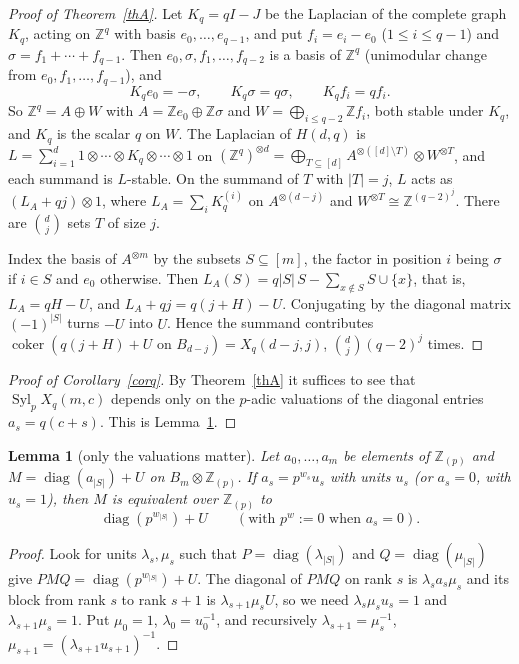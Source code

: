 \documentclass[10pt]{article}
\theoremstyle{ds}
\newtheorem{lemma}{Lemma}
\theoremstyle{dsrem}
\newcommand{\Z}{\mathbb{Z}}
\newcommand{\Syl}{\operatorname{Syl}}
\newcommand{\coker}{\operatorname{coker}}
\begin{document}
\begin{proof}[Proof of Theorem~\ref{thA}]
Let $K_q=qI-J$ be the Laplacian of the complete graph $K_q$, acting on $\Z^q$ with basis $e_0,\dots,e_{q-1}$, and put $f_i=e_i-e_0$ ($1\le i\le q-1$) and $\sigma=f_1+\cdots+f_{q-1}$. Then $e_0,\sigma,f_1,\dots,f_{q-2}$ is a basis of $\Z^q$ (unimodular change from $e_0,f_1,\dots,f_{q-1}$), and
\[
K_qe_0=-\sigma,\qquad K_q\sigma=q\sigma,\qquad K_qf_i=qf_i .
\]
So $\Z^q=A\oplus W$ with $A=\Z e_0\oplus\Z\sigma$ and $W=\bigoplus_{i\le q-2}\Z f_i$, both stable under $K_q$, and $K_q$ is the scalar $q$ on $W$. The Laplacian of $H(d,q)$ is $L=\sum_{i=1}^d 1\otimes\cdots\otimes K_q\otimes\cdots\otimes1$ on $(\Z^q)^{\otimes d}=\bigoplus_{T\subseteq[d]}A^{\otimes([d]\setminus T)}\otimes W^{\otimes T}$, and each summand is $L$-stable. On the summand of $T$ with $|T|=j$, $L$ acts as $(L_A+qj)\otimes1$, where $L_A=\sum_i K_q^{(i)}$ on $A^{\otimes(d-j)}$ and $W^{\otimes T}\cong\Z^{(q-2)^j}$. There are $\binom dj$ sets $T$ of size $j$.

Index the basis of $A^{\otimes m}$ by the subsets $S\subseteq[m]$, the factor in position $i$ being $\sigma$ if $i\in S$ and $e_0$ otherwise. Then $L_A(S)=q|S|\,S-\sum_{x\notin S}S\cup\{x\}$, that is, $L_A=qH-U$, and $L_A+qj=q(j+H)-U$. Conjugating by the diagonal matrix $(-1)^{|S|}$ turns $-U$ into $U$. Hence the summand contributes $\coker(q(j+H)+U\text{ on }B_{d-j})=X_q(d-j,j)$, $\binom dj(q-2)^j$ times.
\end{proof}

\begin{proof}[Proof of Corollary~\ref{corq}]
By Theorem~\ref{thA} it suffices to see that $\Syl_p X_q(m,c)$ depends only on the $p$-adic valuations of the diagonal entries $a_s=q(c+s)$. This is Lemma~\ref{profile}.
\end{proof}

\begin{lemma}[only the valuations matter]\label{profile}
Let $a_0,\dots,a_m$ be elements of $\Z_{(p)}$ and $M=\operatorname{diag}(a_{|S|})+U$ on $B_m\otimes\Z_{(p)}$. If $a_s=p^{w_s}u_s$ with units $u_s$ (or $a_s=0$, with $u_s=1$), then $M$ is equivalent over $\Z_{(p)}$ to
\[\operatorname{diag}(p^{w_{|S|}})+U\qquad(\text{with } p^{w}:=0 \text{ when } a_s=0).\]
\end{lemma}

\begin{proof}
Look for units $\lambda_s,\mu_s$ such that $P=\operatorname{diag}(\lambda_{|S|})$ and $Q=\operatorname{diag}(\mu_{|S|})$ give $PMQ=\operatorname{diag}(p^{w_{|S|}})+U$. The diagonal of $PMQ$ on rank $s$ is $\lambda_s a_s\mu_s$ and its block from rank $s$ to rank $s+1$ is $\lambda_{s+1}\mu_s U$, so we need $\lambda_s\mu_su_s=1$ and $\lambda_{s+1}\mu_s=1$. Put $\mu_0=1$, $\lambda_0=u_0^{-1}$, and recursively $\lambda_{s+1}=\mu_s^{-1}$, $\mu_{s+1}=(\lambda_{s+1}u_{s+1})^{-1}$.
\end{proof}
\end{document}
